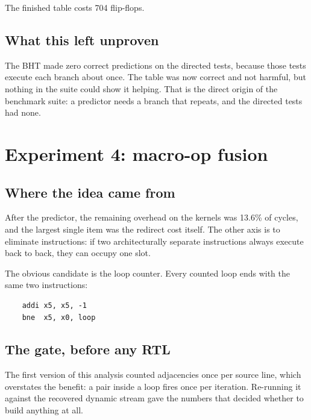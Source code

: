 \documentclass[11pt]{article}
\begin{document}
The finished table costs 704 flip-flops.

\subsection{What this left unproven}

The BHT made zero correct predictions on the directed tests, because those tests execute each
branch about once. The table was now correct and not harmful, but nothing in the suite could
show it helping. That is the direct origin of the benchmark suite: a predictor needs a branch
that repeats, and the directed tests had none.

\section{Experiment 4: macro-op fusion}

\subsection{Where the idea came from}

After the predictor, the remaining overhead on the kernels was 13.6\% of cycles, and the largest
single item was the redirect cost itself. The other axis is to eliminate instructions: if two
architecturally separate instructions always execute back to back, they can occupy one slot.

The obvious candidate is the loop counter. Every counted loop ends with the same two
instructions:

\begin{verbatim}
    addi x5, x5, -1
    bne  x5, x0, loop
\end{verbatim}

\subsection{The gate, before any RTL}

The first version of this analysis counted adjacencies once per source line, which overstates
the benefit: a pair inside a loop fires once per iteration. Re-running it against the recovered
dynamic stream gave the numbers that decided whether to build anything at all.
\end{document}
